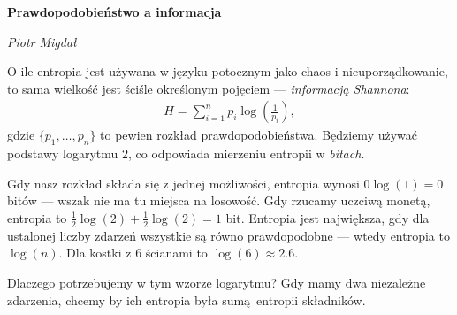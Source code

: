 \documentclass[10pt,a4paper]{article}
\begin{document}
\noindent\textbf{\LARGE Prawdopodobieństwo a informacja}

\medskip
\noindent\textit{\Large Piotr Migdał} 

\medskip

O ile entropia jest używana w języku potocznym jako chaos i nieuporządkowanie, to sama wielkość jest ściśle określonym pojęciem --- \emph{informacją Shannona}:
%
%
\begin{align}
    H = \sum_{i=1}^{n} p_i \log \left(\tfrac{1}{p_i} \right),\label{eq:entropia}
\end{align}
%
%
gdzie $\{p_1, \ldots, p_n\}$ to pewien rozkład prawdopodobieństwa. Będziemy używać podstawy logarytmu $2$, co odpowiada mierzeniu entropii w \emph{bitach}. 

Gdy nasz rozkład składa się z jednej możliwości, entropia wynosi $0 \log(1) = 0$ bitów --- wszak nie ma tu miejsca na losowość.
Gdy rzucamy uczciwą monetą, entropia to $\tfrac{1}{2} \log(2) + \tfrac{1}{2} \log(2) = 1$ bit.
Entropia jest największa, gdy dla ustalonej liczby zdarzeń wszystkie są równo prawdopodobne --- wtedy entropia to $\log(n)$.
Dla kostki z $6$ ścianami to $\log(6)\approx 2.6$. 


Dlaczego potrzebujemy w tym wzorze logarytmu? 
Gdy mamy dwa niezależne zdarzenia, chcemy by ich entropia była sumą entropii składników.
\end{document}
